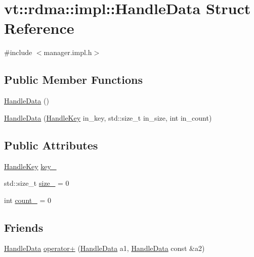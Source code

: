 \hypertarget{structvt_1_1rdma_1_1impl_1_1_handle_data}{}\section{vt\+:\+:rdma\+:\+:impl\+:\+:Handle\+Data Struct Reference}
\label{structvt_1_1rdma_1_1impl_1_1_handle_data}


{\ttfamily \#include $<$manager.\+impl.\+h$>$}

\subsection*{Public Member Functions}
\begin{DoxyCompactItemize}
\item 
\hyperlink{structvt_1_1rdma_1_1impl_1_1_handle_data_adb5fa646ed809e1eee6dc1b3a92c53a1}{Handle\+Data} ()
\item 
\hyperlink{structvt_1_1rdma_1_1impl_1_1_handle_data_ad824b76d3324b98059f8708d8e0823e4}{Handle\+Data} (\hyperlink{structvt_1_1rdma_1_1_handle_key}{Handle\+Key} in\+\_\+key, std\+::size\+\_\+t in\+\_\+size, int in\+\_\+count)
\end{DoxyCompactItemize}
\subsection*{Public Attributes}
\begin{DoxyCompactItemize}
\item 
\hyperlink{structvt_1_1rdma_1_1_handle_key}{Handle\+Key} \hyperlink{structvt_1_1rdma_1_1impl_1_1_handle_data_a7dce9ae3b0d1704b479feb32063efee0}{key\+\_\+}
\item 
std\+::size\+\_\+t \hyperlink{structvt_1_1rdma_1_1impl_1_1_handle_data_a2a540d55d5fff52c4de6e677892f6374}{size\+\_\+} = 0
\item 
int \hyperlink{structvt_1_1rdma_1_1impl_1_1_handle_data_ae4c0e267300c40b8de9233c0e968d1ad}{count\+\_\+} = 0
\end{DoxyCompactItemize}
\subsection*{Friends}
\begin{DoxyCompactItemize}
\item 
\hyperlink{structvt_1_1rdma_1_1impl_1_1_handle_data}{Handle\+Data} \hyperlink{structvt_1_1rdma_1_1impl_1_1_handle_data_a0db838048458aea13961a4e3494c6ddb}{operator+} (\hyperlink{structvt_1_1rdma_1_1impl_1_1_handle_data}{Handle\+Data} a1, \hyperlink{structvt_1_1rdma_1_1impl_1_1_handle_data}{Handle\+Data} const \&a2)
\end{DoxyCompactItemize}


